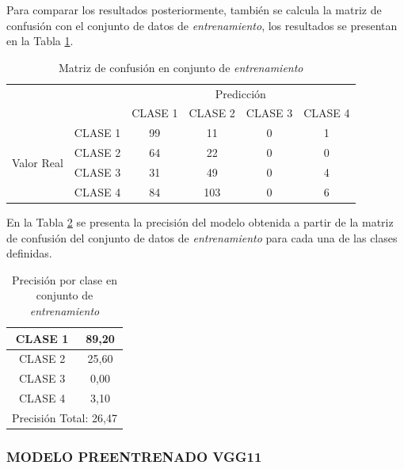 Para comparar los resultados posteriormente, también se calcula la matriz de confusión con el conjunto de datos de \textit{entrenamiento}, los resultados se presentan en la Tabla \ref{fig:MC_VGG19_2}.

\begin{table}[htbp]
	\centering
	\resizebox{12cm}{!} {
		\begin{tabular}{|c|l|c|c|c|c|}
			\hline
			\multicolumn{2}{|c|}{\multirow{2}[4]{*}{}} & \multicolumn{4}{c|}{Predicción} \bigstrut\\
			\cline{3-6}    \multicolumn{2}{|c|}{} & CLASE 1 & CLASE 2 & CLASE 3 & CLASE 4 \bigstrut\\
			\hline
			\multirow{4}[8]{*}{\begin{sideways}Valor Real\end{sideways}} & CLASE 1 & 99     & 11     & 0    & 1 \bigstrut\\
			\cline{2-6}     & CLASE 2 & 64     & 22     & 0    & 0 \bigstrut\\
			\cline{2-6}      & CLASE 3 & 31     & 49     & 0    & 4 \bigstrut\\
			\cline{2-6}     & CLASE 4 & 84     & 103     & 0    & 6 \bigstrut\\
			\hline
		\end{tabular}
	}
	\caption{Matriz de confusión en conjunto de \textit{entrenamiento}}
	\label{fig:MC_VGG19_2}
\end{table}

En la Tabla \ref{fig:ACU_VGG19_2} se presenta la precisión del modelo obtenida a partir de la matriz de confusión del conjunto de datos de \textit{entrenamiento} para cada una de las clases definidas.

\begin{table}[htbp]
	\centering
	\begin{tabular}{|c|c|}
		\hline
		CLASE 1 & 89,20 \bigstrut\\
		\hline
		CLASE 2 & 25,60 \bigstrut\\
		\hline
		CLASE 3 & 0,00 \bigstrut\\
		\hline
		CLASE 4 & 3,10 \bigstrut\\
		\hline
		\multicolumn{2}{|c|}{Precisión Total: 26,47} \bigstrut\\
		\hline
	\end{tabular}%
	\caption{Precisión por clase en conjunto de \textit{entrenamiento}}
	\label{fig:ACU_VGG19_2}
\end{table}

\newpage
\subsubsection{\MakeUppercase{Modelo preentrenado VGG11}}


